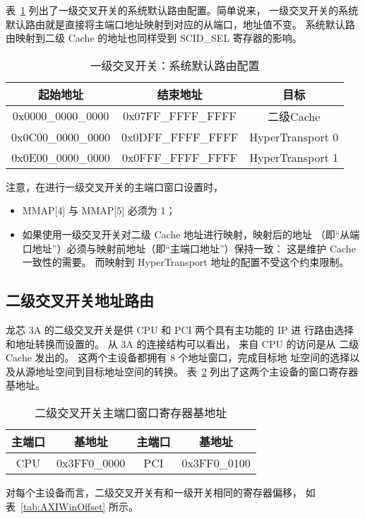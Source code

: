 表~\ref{tab:X1defaultAddrWin} 列出了一级交叉开关的系统默认路由配置。简单说来，
一级交叉开关的系统默认路由就是直接将主端口地址映射到对应的从端口，地址值不变。
系统默认路由映射到二级 Cache 的地址也同样受到 SCID\_SEL 寄存器的影响。
\begin{table}[htbp]
  \centering
  \begin{tabular}{|c|c|c|} \hline
  起始地址 & 结束地址 & 目标 \\ \hline
  0x0000\_0000\_0000 & 0x07FF\_FFFF\_FFFF & 二级Cache \\ \hline
  0x0C00\_0000\_0000 & 0x0DFF\_FFFF\_FFFF & HyperTransport 0 \\ \hline
  0x0E00\_0000\_0000 & 0x0FFF\_FFFF\_FFFF & HyperTransport 1 \\ \hline
  \end{tabular}
  \caption{一级交叉开关：系统默认路由配置}
  \label{tab:X1defaultAddrWin}
\end{table}

\newpage
\noindent 注意，在进行一级交叉开关的主端口窗口设置时，
\begin{itemize}
  \item MMAP[4] 与 MMAP[5] 必须为 1；
  \item 如果使用一级交叉开关对二级 Cache 地址进行映射，映射后的地址
    （即``从端口地址''）必须与映射前地址（即``主端口地址''）保持一致： 这是维护
    Cache 一致性的需要。 而映射到 HyperTransport 地址的配置不受这个约束限制。
\end{itemize}

\subsection{二级交叉开关地址路由}

龙芯 3A 的二级交叉开关是供 CPU 和 PCI 两个具有主功能的 IP 进
行路由选择和地址转换而设置的。 从 3A 的连接结构可以看出， 来自 CPU 的访问是从
二级 Cache 发出的。 这两个主设备都拥有 8 个地址窗口，完成目标地
址空间的选择以及从源地址空间到目标地址空间的转换。
表~\ref{tab:X2MasterWinBases} 列出了这两个主设备的窗口寄存器基地址。
\begin{table}[htbp]
  \centering
  \begin{tabular}{|c|c||c|c|} \hline
    主端口 & 基地址       & 主端口 & 基地址       \\ \hline
    CPU    & 0x3FF0\_0000 & PCI    & 0x3FF0\_0100 \\ \hline
  \end{tabular}
  \caption{二级交叉开关主端口窗口寄存器基地址}
  \label{tab:X2MasterWinBases}
\end{table}
\newline 对每个主设备而言，二级交叉开关有和一级开关相同的寄存器偏移，
如表~\ref{tab:AXIWinOffset} 所示。

